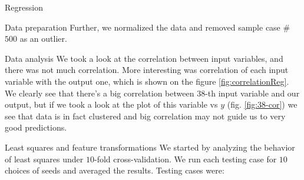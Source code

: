 \documentclass{article}
\begin{document}
\begin{section}{Regression}
\begin{subsection}{Data preparation}
Further, we normalized the data and removed sample case \#$500$ as an outlier.
\end{subsection}
\begin{subsection}{Data analysis}
We took a look at the correlation between input variables, and there was not much correlation. More interesting was correlation of each input variable with the output one, which is shown on the figure \ref{fig:correlationReg}. We clearly see that there's a big correlation between $38$-th input variable and our output, but if we took a look at the plot of this variable vs $y$ (fig. \ref{fig:38-cor}) we see that data is in fact clustered and big correlation may not guide us to very good predictions.
\begin{figure}[!h]
\center
{}
\hfill
{}
\caption{}
\end{figure}
\end{subsection}
\begin{subsection}{Least squares and feature transformations}
We started by analyzing the behavior of least squares under $10$-fold cross-validation. We run each testing case for $10$ choices of seeds and averaged the results. Testing cases were:

\end{subsection}
\end{section}
\end{document}
